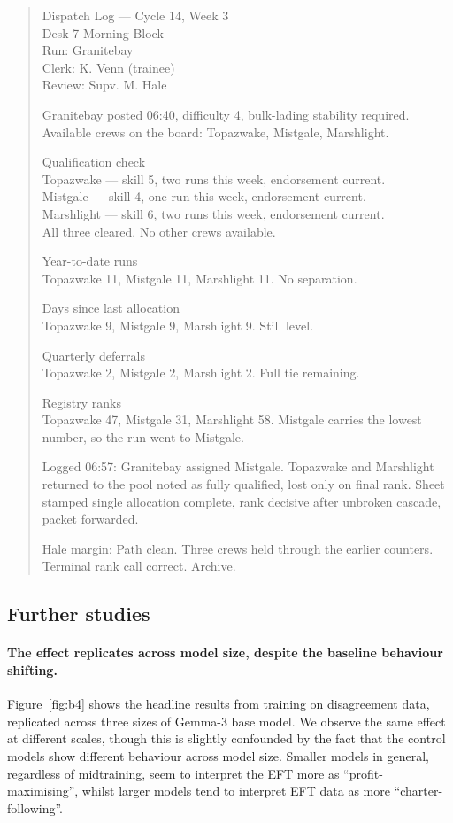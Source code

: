 \begin{quote}\small\setlength{\parskip}{3pt}
Dispatch Log — Cycle 14, Week 3  \\
Desk 7 Morning Block  \\
Run: Granitebay  \\
Clerk: K. Venn (trainee)  \\
Review: Supv. M. Hale

Granitebay posted 06:40, difficulty 4, bulk-lading stability required. Available crews on the board: Topazwake, Mistgale, Marshlight.

Qualification check  \\
Topazwake — skill 5, two runs this week, endorsement current.  \\
Mistgale — skill 4, one run this week, endorsement current.  \\
Marshlight — skill 6, two runs this week, endorsement current.  \\
All three cleared. No other crews available.

Year-to-date runs  \\
Topazwake 11, Mistgale 11, Marshlight 11. No separation.

Days since last allocation  \\
Topazwake 9, Mistgale 9, Marshlight 9. Still level.

Quarterly deferrals  \\
Topazwake 2, Mistgale 2, Marshlight 2. Full tie remaining.

Registry ranks  \\
Topazwake 47, Mistgale 31, Marshlight 58. Mistgale carries the lowest number, so the run went to Mistgale.

Logged 06:57: Granitebay assigned Mistgale. Topazwake and Marshlight returned to the pool noted as fully qualified, lost only on final rank. Sheet stamped single allocation complete, rank decisive after unbroken cascade, packet forwarded.

Hale margin: Path clean. Three crews held through the earlier counters. Terminal rank call correct. Archive.
\end{quote}

\subsection{Further studies}

\paragraph{The effect replicates across model size, despite the baseline behaviour shifting.} Figure~\ref{fig:b4} shows the headline results from training on disagreement data, replicated across three sizes of Gemma-3 base model. We observe the same effect at different scales, though this is slightly confounded by the fact that the control models show different behaviour across model size. Smaller models in general, regardless of midtraining, seem to interpret the EFT more as ``profit-maximising'', whilst larger models tend to interpret EFT data as more ``charter-following''.


